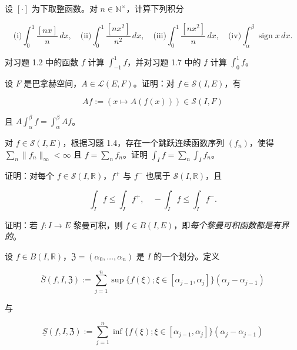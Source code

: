 \begin{exercises}
\item

设 $ [\cdot] $ 为下取整函数。对 $ n \in \mathbb{N}^{\times} $，计算下列积分

\[
\text{(i)} \int_{0}^{1} \frac{[nx]}{n} \, dx , \quad \text{(ii)} \int_{0}^{1} \frac{[nx^2]}{n^2} \, dx , \quad \text{(iii)} \int_{0}^{1} \frac{[nx^2]}{n} \, dx , \quad \text{(iv)} \int_{\alpha}^{\beta} \operatorname{sign} x \, dx .
\]
\item

对习题 1.2 中的函数 $ f $ 计算 $ \int_{-1}^{1} f $，并对习题 1.7 中的 $ f $ 计算 $ \int_{0}^{1} f $。

\item

设 $ F $ 是巴拿赫空间，$ A \in \mathcal{L}(E, F) $。证明：对 $ f \in \mathcal{S}(I, E) $，有

\[
Af := (x \mapsto A(f(x))) \in \mathcal{S}(I, F)
\]

且 $ A\int_{\alpha}^{\beta} f = \int_{\alpha}^{\beta} Af $。

\item

对 $ f \in \mathcal{S}(I, E) $，根据习题 1.4，存在一个跳跃连续函数序列 $ (f_n) $，使得 $ \sum_{n} \|f_n\|_{\infty} < \infty $ 且 $ f = \sum_{n} f_n $。证明 $ \int_{I} f = \sum_{n} \int_{I} f_n $。

\item

证明：对每个 $ f \in \mathcal{S}(I, \mathbb{R}) $，$ f^{+} $ 与 $ f^{-} $ 也属于 $ \mathcal{S}(I, \mathbb{R}) $，且

\[
\int_{I} f \le \int_{I} f^{+} , \quad -\int_{I} f \le \int_{I} f^{-} .
\]
\item

证明：若 $ f : I \to E $ 黎曼可积，则 $ f \in B(I, E) $，即\emph{每个黎曼可积函数都是有界的}。

\item

设 $ f \in B(I, \mathbb{R}) $，$ \mathfrak{Z} = (\alpha_0, \ldots, \alpha_n) $ 是 $ I $ 的一个划分。定义

\[
\overline{S}(f, I, \mathfrak{Z}) := \sum_{j=1}^{n} \sup\{f(\xi) ; \xi \in [\alpha_{j-1}, \alpha_j]\}(\alpha_j - \alpha_{j-1})
\]

与

\[
\underline{S}(f, I, \mathfrak{Z}) := \sum_{j=1}^{n} \inf\{f(\xi) ; \xi \in [\alpha_{j-1}, \alpha_j]\}(\alpha_j - \alpha_{j-1})
\]


\end{exercises}
